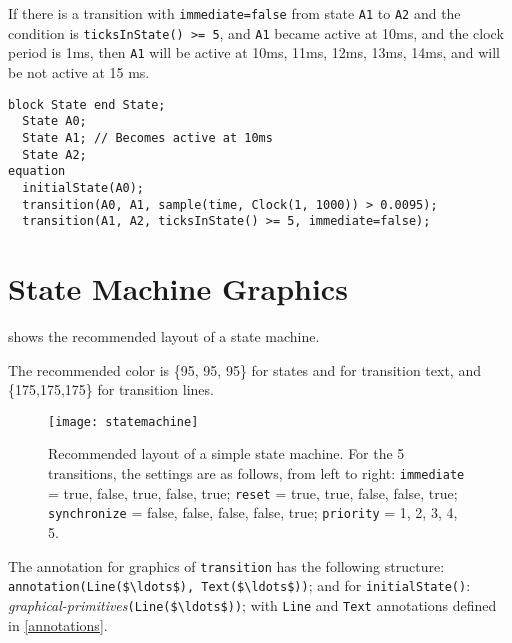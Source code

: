 \begin{example}
If there is a transition with \lstinline!immediate=false! from
state \lstinline!A1! to \lstinline!A2! and the condition is \lstinline!ticksInState() >= 5!, and \lstinline!A1! became
active at 10ms, and the clock period is 1ms, then \lstinline!A1! will be active at
10ms, 11ms, 12ms, 13ms, 14ms, and will be not active at 15 ms.
\begin{lstlisting}[language=modelica]
  block State end State;
  State A0;
  State A1; // Becomes active at 10ms
  State A2;
equation
  initialState(A0);
  transition(A0, A1, sample(time, Clock(1, 1000)) > 0.0095);
  transition(A1, A2, ticksInState() >= 5, immediate=false);
\end{lstlisting}
\end{example}

\section{State Machine Graphics}\label{state-machine-graphics}

\begin{nonnormative}
 shows the recommended layout of a state machine.

The recommended color is \{95, 95, 95\} for states and for transition text, and \{175,175,175\} for transition lines.
\end{nonnormative}

\begin{figure}[H]
  \begin{center}
    \texttt{[image: statemachine]}
  \end{center}
  \caption{Recommended layout of a simple state machine.  For the 5 transitions, the settings are as follows, from left to right: \lstinline!immediate! = true, false, true, false, true; \lstinline!reset! = true, true, false, false, true; \lstinline!synchronize! = false, false, false, false, true; \lstinline!priority! = 1, 2, 3, 4, 5.}
  \label{fig:state-machine-layout}
\end{figure}

The annotation for graphics of \lstinline!transition! has the following
structure: \lstinline!annotation(Line($\ldots$), Text($\ldots$))!; and for
\lstinline!initialState()!: \emph{graphical-primitives}\lstinline!(Line($\ldots$))!; with \lstinline!Line!
and \lstinline!Text! annotations defined in \cref{annotations}.

